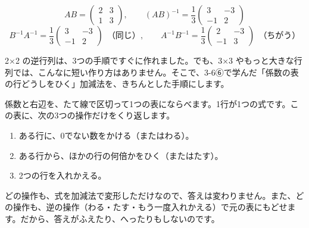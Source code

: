 \[ AB=\begin{pmatrix}2&3\\1&3\end{pmatrix},\qquad (AB)^{-1}=\frac{1}{3}\begin{pmatrix}3&-3\\-1&2\end{pmatrix} \]
\[ B^{-1}A^{-1}=\frac{1}{3}\begin{pmatrix}3&-3\\-1&2\end{pmatrix}\ \ \text{（同じ）},\qquad A^{-1}B^{-1}=\frac{1}{3}\begin{pmatrix}2&-3\\-1&3\end{pmatrix}\ \ \text{（ちがう）} \]


\leavevmode\label{bk:7-5:hakidashi}2×2 の逆行列は、3つの手順ですぐに作れました。でも、3×3 やもっと大きな行列では、こんなに短い作り方はありません。そこで、3-6⑥で学んだ「係数の表の行どうしをひく」加減法を、きちんとした手順にします。

係数と右辺を、たて線で区切って1つの表にならべます。1行が1つの式です。この表に、次の3つの操作だけをくり返します。
\begin{enumerate}[label={\sffamily\bfseries\color{\bkTT}操作\arabic*}, leftmargin=4.2\zw, itemsep=1pt, topsep=2pt]
\item ある行に、0でない数をかける（またはわる）。
\item ある行から、ほかの行の何倍かをひく（またはたす）。
\item 2つの行を入れかえる。
\end{enumerate}
どの操作も、式を加減法で変形しただけなので、答えは変わりません。また、どの操作も、逆の操作（わる・たす・もう一度入れかえる）で元の表にもどせます。だから、答えがふえたり、へったりもしないのです。

